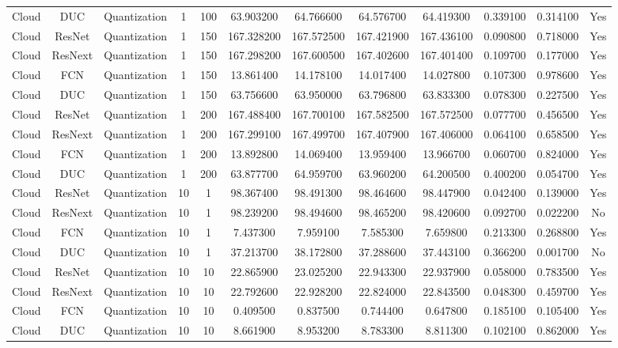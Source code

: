 \begin{tabular}{|c||c||c||c||c||c||c||c||c||c||c||c|}
Cloud & DUC & Quantization & 1 & 100 & 63.903200 & 64.766600 & 64.576700 & 64.419300 & 0.339100 & 0.314100 & Yes \\
Cloud & ResNet & Quantization & 1 & 150 & 167.328200 & 167.572500 & 167.421900 & 167.436100 & 0.090800 & 0.718000 & Yes \\
Cloud & ResNext & Quantization & 1 & 150 & 167.298200 & 167.600500 & 167.402600 & 167.401400 & 0.109700 & 0.177000 & Yes \\
Cloud & FCN & Quantization & 1 & 150 & 13.861400 & 14.178100 & 14.017400 & 14.027800 & 0.107300 & 0.978600 & Yes \\
Cloud & DUC & Quantization & 1 & 150 & 63.756600 & 63.950000 & 63.796800 & 63.833300 & 0.078300 & 0.227500 & Yes \\
Cloud & ResNet & Quantization & 1 & 200 & 167.488400 & 167.700100 & 167.582500 & 167.572500 & 0.077700 & 0.456500 & Yes \\
Cloud & ResNext & Quantization & 1 & 200 & 167.299100 & 167.499700 & 167.407900 & 167.406000 & 0.064100 & 0.658500 & Yes \\
Cloud & FCN & Quantization & 1 & 200 & 13.892800 & 14.069400 & 13.959400 & 13.966700 & 0.060700 & 0.824000 & Yes \\
Cloud & DUC & Quantization & 1 & 200 & 63.877700 & 64.959700 & 63.960200 & 64.200500 & 0.400200 & 0.054700 & Yes \\
Cloud & ResNet & Quantization & 10 & 1 & 98.367400 & 98.491300 & 98.464600 & 98.447900 & 0.042400 & 0.139000 & Yes \\
Cloud & ResNext & Quantization & 10 & 1 & 98.239200 & 98.494600 & 98.465200 & 98.420600 & 0.092700 & 0.022200 & No \\
Cloud & FCN & Quantization & 10 & 1 & 7.437300 & 7.959100 & 7.585300 & 7.659800 & 0.213300 & 0.268800 & Yes \\
Cloud & DUC & Quantization & 10 & 1 & 37.213700 & 38.172800 & 37.288600 & 37.443100 & 0.366200 & 0.001700 & No \\
Cloud & ResNet & Quantization & 10 & 10 & 22.865900 & 23.025200 & 22.943300 & 22.937900 & 0.058000 & 0.783500 & Yes \\
Cloud & ResNext & Quantization & 10 & 10 & 22.792600 & 22.928200 & 22.824000 & 22.843500 & 0.048300 & 0.459700 & Yes \\
Cloud & FCN & Quantization & 10 & 10 & 0.409500 & 0.837500 & 0.744400 & 0.647800 & 0.185100 & 0.105400 & Yes \\
Cloud & DUC & Quantization & 10 & 10 & 8.661900 & 8.953200 & 8.783300 & 8.811300 & 0.102100 & 0.862000 & Yes \\

\end{tabular}
